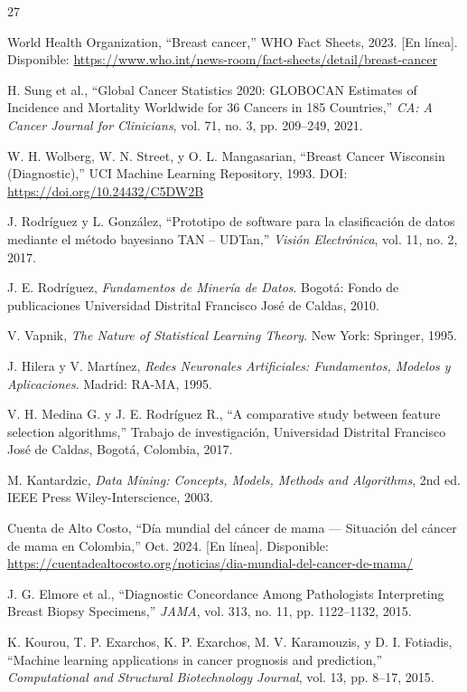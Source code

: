 \documentclass[journal]{IEEEtran}
\begin{document}
\begin{thebibliography}{27}

World Health Organization, ``Breast cancer,'' WHO Fact Sheets, 2023. [En línea]. Disponible: \url{https://www.who.int/news-room/fact-sheets/detail/breast-cancer}

H. Sung et al., ``Global Cancer Statistics 2020: GLOBOCAN Estimates of Incidence and Mortality Worldwide for 36 Cancers in 185 Countries,'' \textit{CA: A Cancer Journal for Clinicians}, vol. 71, no. 3, pp. 209--249, 2021.

W. H. Wolberg, W. N. Street, y O. L. Mangasarian, ``Breast Cancer Wisconsin (Diagnostic),'' UCI Machine Learning Repository, 1993. DOI: \url{https://doi.org/10.24432/C5DW2B}

J. Rodríguez y L. González, ``Prototipo de software para la clasificación de datos mediante el método bayesiano TAN -- UDTan,'' \textit{Visión Electrónica}, vol. 11, no. 2, 2017.

J. E. Rodríguez, \textit{Fundamentos de Minería de Datos}. Bogotá: Fondo de publicaciones Universidad Distrital Francisco José de Caldas, 2010.

V. Vapnik, \textit{The Nature of Statistical Learning Theory}. New York: Springer, 1995.

J. Hilera y V. Martínez, \textit{Redes Neuronales Artificiales: Fundamentos, Modelos y Aplicaciones}. Madrid: RA-MA, 1995.

V. H. Medina G. y J. E. Rodríguez R., ``A comparative study between feature selection algorithms,'' Trabajo de investigación, Universidad Distrital Francisco José de Caldas, Bogotá, Colombia, 2017.

M. Kantardzic, \textit{Data Mining: Concepts, Models, Methods and Algorithms}, 2nd ed. IEEE Press Wiley-Interscience, 2003.

Cuenta de Alto Costo, ``Día mundial del cáncer de mama --- Situación del cáncer de mama en Colombia,'' Oct. 2024. [En línea]. Disponible: \url{https://cuentadealtocosto.org/noticias/dia-mundial-del-cancer-de-mama/}

J. G. Elmore et al., ``Diagnostic Concordance Among Pathologists Interpreting Breast Biopsy Specimens,'' \textit{JAMA}, vol. 313, no. 11, pp. 1122--1132, 2015.

K. Kourou, T. P. Exarchos, K. P. Exarchos, M. V. Karamouzis, y D. I. Fotiadis, ``Machine learning applications in cancer prognosis and prediction,'' \textit{Computational and Structural Biotechnology Journal}, vol. 13, pp. 8--17, 2015.


\end{thebibliography}
\end{document}
